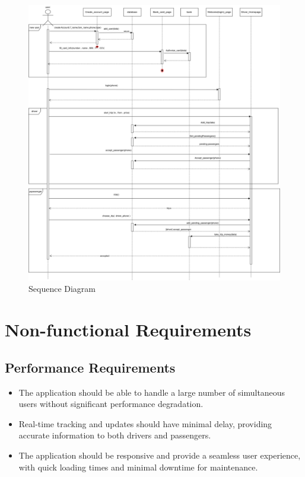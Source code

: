 \documentclass{BusMateSRS}
\begin{document}
\pagebreak

\begin{figure}[ht!]
	\begin{center}
		\includegraphics[width=\columnwidth]{drawings/sequence_diagram.drawio.png}
	\end{center}
	\caption{Sequence Diagram}
	\label{fig:sequence-diagram}
\end{figure}


\pagebreak


\section{Non-functional Requirements}
\subsection{Performance Requirements}
\begin{itemize}
	\item The application should be able to handle a large number of simultaneous
	      users without significant performance degradation.
	\item Real-time tracking and updates should have minimal delay,
	      providing accurate information to both drivers and passengers.
	\item The application should be responsive and provide a seamless user
	      experience, with quick loading times and minimal downtime for maintenance.
\end{itemize}
\end{document}
